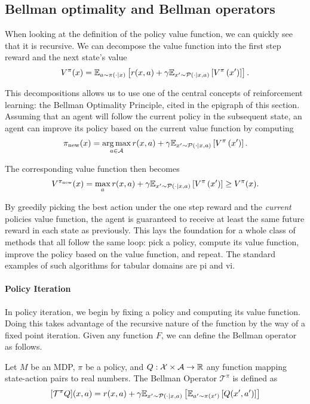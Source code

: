 \subsection{Bellman optimality and Bellman operators}

When looking at the definition of the policy value function, we can quickly see that it is recursive.
We can decompose the value function into the first step reward and the next state's value $$V^\pi(x) = \mathbb{E}_{a\sim\pi(\cdot|x)}\left[r(x,a) + \gamma \mathbb{E}_{x'\sim\mathcal{P}(\cdot|x,a)}\left[V^\pi\left(x'\right)\right]\right].$$

This decompositions allows us to use one of the central concepts of reinforcement learning: the Bellman Optimality Principle, cited in the epigraph of this section.
Assuming that an agent will follow the current policy in the subsequent state, an agent can improve its policy based on the current value function by computing $$\pi_\mathrm{new}(x) = \operatorname*{arg\,max}_{a \in \mathcal{A}} r(x,a) + \gamma \mathbb{E}_{x'\sim\mathcal{P}(\cdot|x,a)}\left[V^\pi\left(x'\right)\right].$$

The corresponding value function then becomes
$$V^{\pi_\mathrm{new}}(x) = \max_a r(x,a) + \gamma \mathbb{E}_{x'\sim\mathcal{P}(\cdot|x,a)}\left[V^\pi\left(x'\right)\right] \geq V^\pi(x).$$

By greedily picking the best action under the one step reward and the \emph{current} policies value function, the agent is guaranteed to receive at least the same future reward in each state as previously.
This lays the foundation for a whole class of methods that all follow the same loop: pick a policy, compute its value function, improve the policy based on the value function, and repeat.
The standard examples of such algorithms for tabular domains are \ac{pi} and \ac{vi}.

\paragraph{Policy Iteration}

In policy iteration, we begin by fixing a policy and computing its value function.
Doing this takes advantage of the recursive nature of the function by the way of a fixed point iteration.
Given any function $F$, we can define the Bellman operator as follows.

\begin{definition}
    Let $M$ be an MDP, $\pi$ be a policy, and $Q: \mathcal{X} \times \mathcal{A} \rightarrow \mathbb{R}$ any function mapping state-action pairs to real numbers.
    The Bellman Operator $\mathcal{T}^\pi$ is defined as
    $$[\mathcal{T}^\pi Q](x,a) = r(x,a) + \gamma \mathbb{E}_{x'\sim \mathcal{P}(\cdot|x,a)}\left[\mathbb{E}_{a'\sim\pi(x')}\left[Q(x',a')\right]\right]$$
\end{definition}

